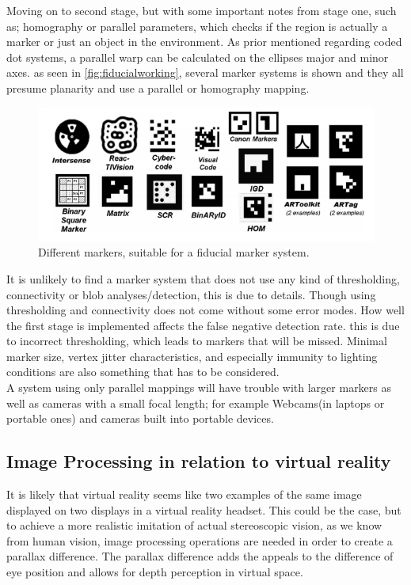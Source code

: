			Moving on to second stage, but with some important notes from stage one, such as; homography or parallel parameters, which checks if the region is actually a marker or just an object in the environment. As prior mentioned regarding coded dot systems, a parallel warp can be calculated on the ellipses major and minor axes.
			as seen in \autoref{fig:fiducialworking}, several marker systems is shown and they all presume planarity and use a parallel or homography mapping.
			
			\begin{figure}[H]
				\centering
				\includegraphics[width=0.9\linewidth]{figure/Analysis/fiducialworking.png}
				\caption{Different markers, suitable for a fiducial marker system.}
				\label{fig:fiducialworking}
			\end{figure}
			
			It is unlikely to find a marker system that does not use any kind of thresholding, connectivity or blob analyses/detection, this is due to details. Though using thresholding and connectivity does not come without some error modes. How well the first stage is implemented affects the false negative detection rate. this is due to incorrect thresholding, which leads to markers that will be missed. Minimal marker size, vertex jitter characteristics, and especially immunity to
			lighting conditions\cite{fidOcclusion} are also something that has to be considered.\\
			
			A system using only parallel mappings will have trouble with larger markers as well as cameras with a small focal length; for example Webcams(in laptops or portable ones) and cameras built into portable devices.
			
		\subsection{Image Processing in relation to virtual reality}
		It is likely that virtual reality seems like two examples of the same image displayed on two displays in a virtual reality headset. This could be the case, but to achieve a more realistic imitation of actual stereoscopic vision, as we know from human vision, image processing operations are needed in order to create a parallax difference. The parallax difference adds the appeals to the difference of eye position and allows for depth perception in virtual space.
												
